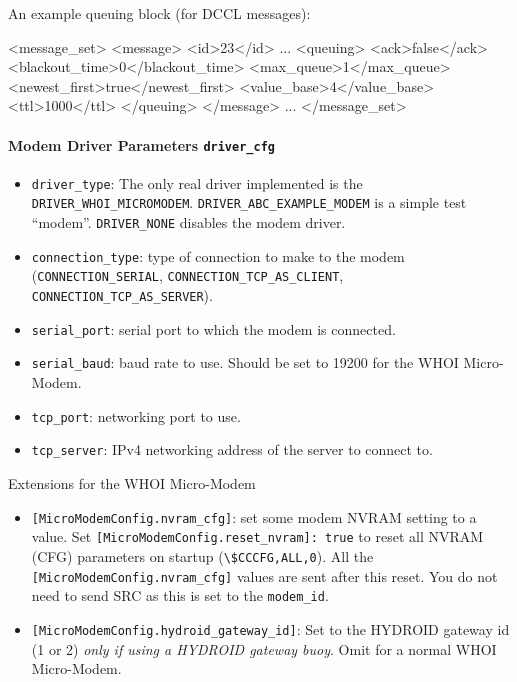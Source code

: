 \documentclass[11pt, letterpaper, oneside]{memoir}
\begin{document}
An example queuing block (for DCCL messages):
\begin{small}
\begin{boxedverbatim}
<message_set>
  <message>
    <id>23</id>
    ...
    <queuing>
      <ack>false</ack>
      <blackout_time>0</blackout_time>
      <max_queue>1</max_queue>
      <newest_first>true</newest_first>
      <value_base>4</value_base>
      <ttl>1000</ttl>
    </queuing>
  </message>
  ...
</message_set>
\end{boxedverbatim}
\resetbvlinenumber
\end{small}

\paragraph{Modem Driver Parameters \texttt{driver\_cfg}}
\begin{itemize}
\item \verb|driver_type|: The only real driver implemented is the \verb|DRIVER_WHOI_MICROMODEM|. \verb|DRIVER_ABC_EXAMPLE_MODEM| is a simple test ``modem''. \verb|DRIVER_NONE| disables the modem driver.
\item \verb|connection_type|: type of connection to make to the modem (\verb|CONNECTION_SERIAL|, \verb|CONNECTION_TCP_AS_CLIENT|, \verb|CONNECTION_TCP_AS_SERVER|).
\item \verb|serial_port|: serial port to which the modem is connected.
\item \verb|serial_baud|: baud rate to use. Should be set to 19200 for the WHOI Micro-Modem.
\item \verb|tcp_port|: networking port to use. 
\item \verb|tcp_server|: IPv4 networking address of the server to connect to. 
\end{itemize}

Extensions for the WHOI Micro-Modem
\begin{itemize}
\item \verb|[MicroModemConfig.nvram_cfg]|: set some modem NVRAM setting to a value. Set \verb|[MicroModemConfig.reset_nvram]: true| to reset all NVRAM (CFG) parameters on startup (\verb|\$CCCFG,ALL,0|). All the \verb|[MicroModemConfig.nvram_cfg]| values are sent after this reset. You do not need to send SRC as this is set to the \verb|modem_id|.
\item  \verb|[MicroModemConfig.hydroid_gateway_id]|: Set to the HYDROID gateway id (1 or 2) \textit{only if using a HYDROID gateway buoy}. Omit for a normal WHOI Micro-Modem.
\end{itemize} 
\end{document}
